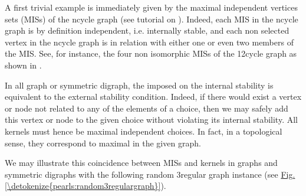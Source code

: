 \documentclass[a4paper,12pt,english]{sphinxhowto}
\begin{document}
\sphinxAtStartPar
A first trivial example is immediately given by the maximal independent vertices sets (MISs) of the n\sphinxhyphen{}cycle graph (see tutorial on ). Indeed, each MIS in the n\sphinxhyphen{}cycle graph is by definition independent, i.e. internally stable, and each non selected vertex in the n\sphinxhyphen{}cycle graph is in relation with either one or even two members of the MIS. See, for instance, the four non isomorphic MISs of the 12\sphinxhyphen{}cycle graph as shown in .

\sphinxAtStartPar
In all graph or symmetric digraph, the  imposed on the internal stability is equivalent to the external stability condition. Indeed, if there would exist a vertex or node not related to any of the elements of a choice, then we may safely add this vertex or node to the given choice without violating its internal stability. All kernels must hence be maximal independent choices. In fact, in a topological sense, they correspond to maximal  in the given graph.

\sphinxAtStartPar
We may illustrate this coincidence between MISs and kernels in graphs
and symmetric digraphs with the following random 3\sphinxhyphen{}regular graph
instance (see \hyperref[\detokenize{pearls:random3regulargraph}]{Fig.\@ \ref{\detokenize{pearls:random3regulargraph}}}).

\begin{sphinxVerbatim}[commandchars=\\\{\},numbers=left,firstnumber=1,stepnumber=1]
   
  
\end{sphinxVerbatim}
\end{document}
